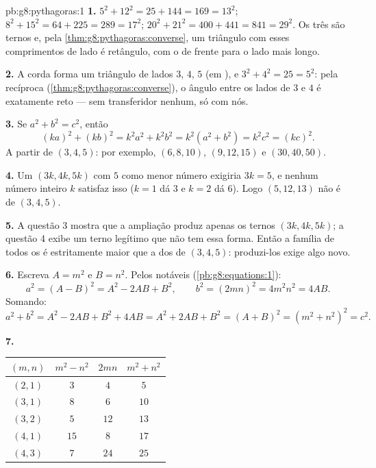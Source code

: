 \begin{solution}{pb:g8:pythagoras:1}
\textbf{1.} $5^2 + 12^2 = 25 + 144 = 169 = 13^2$; \quad
$8^2 + 15^2 = 64 + 225 = 289 = 17^2$; \quad
$20^2 + 21^2 = 400 + 441 = 841 = 29^2$. Os três são ternos e, pela
\cref{thm:g8:pythagoras:converse}, um triângulo com esses comprimentos
de lado é retângulo, com o  de frente para o lado mais
longo.

\textbf{2.} A corda forma um triângulo de lados $3$, $4$, $5$ (em
), e $3^2 + 4^2 = 25 = 5^2$: pela recíproca
(\cref{thm:g8:pythagoras:converse}), o ângulo entre os lados de $3$ e
$4$  é exatamente reto --- sem transferidor nenhum, só com
nós.

\textbf{3.} Se $a^2 + b^2 = c^2$, então
\[
(ka)^2 + (kb)^2 = k^2 a^2 + k^2 b^2
= k^2\left(a^2 + b^2\right) = k^2 c^2 = (kc)^2 .
\]
A partir de $(3, 4, 5)$: por exemplo, $(6, 8, 10)$, $(9, 12, 15)$ e
$(30, 40, 50)$.

\textbf{4.} Um  $(3k, 4k, 5k)$ com $5$ como menor número
exigiria $3k = 5$, e nenhum número inteiro $k$ satisfaz isso ($k = 1$
dá $3$ e $k = 2$ dá $6$). Logo $(5, 12, 13)$ não é  de
$(3, 4, 5)$.

\textbf{5.} A questão 3 mostra que a ampliação produz apenas os ternos
$(3k, 4k, 5k)$; a questão 4 exibe um terno legítimo que não tem essa
forma. Então a família de todos os  é estritamente
maior que a dos  de $(3, 4, 5)$: produzi-los exige algo novo.

\textbf{6.} Escreva $A = m^2$ e $B = n^2$. Pelos  notáveis
(\cref{pb:g8:equations:1}):
\[
a^2 = (A - B)^2 = A^2 - 2AB + B^2,
\qquad
b^2 = (2mn)^2 = 4m^2n^2 = 4AB .
\]
Somando:
\[
a^2 + b^2 = A^2 - 2AB + B^2 + 4AB
= A^2 + 2AB + B^2 = (A + B)^2
= \left(m^2 + n^2\right)^2 = c^2 .
\]

\textbf{7.}
\begin{center}
\renewcommand{\arraystretch}{1.2}
\begin{tabular}{c|ccc}
$(m, n)$ & $m^2 - n^2$ & $2mn$ & $m^2 + n^2$ \\
\hline
$(2, 1)$ & $3$ & $4$ & $5$ \\
$(3, 1)$ & $8$ & $6$ & $10$ \\
$(3, 2)$ & $5$ & $12$ & $13$ \\
$(4, 1)$ & $15$ & $8$ & $17$ \\
$(4, 3)$ & $7$ & $24$ & $25$ \\
\end{tabular}
\end{center}


\end{solution}
